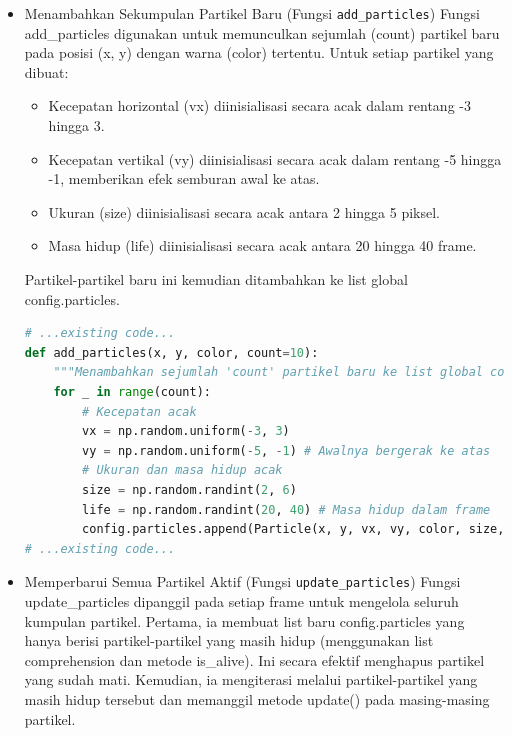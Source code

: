 \documentclass[11pt,a4paper]{article}
\begin{document}
\begin{itemize}
\begin{lstlisting}[language=Python, caption=Method draw]
            if current_size > 0:
                # Untuk menggambar dengan transparansi alpha, perlu blending manual jika tidak menggunakan RGBA image
                # Di sini, kita hanya menggambar lingkaran solid dengan ukuran yang disesuaikan
                # Jika 'img' adalah RGBA, blending bisa lebih canggih
                cv2.circle(img, (int(self.x), int(self.y)), current_size, self.color, -1)
# ...existing code...
\end{lstlisting}
\item Menambahkan Sekumpulan Partikel Baru (Fungsi \texttt{add\_particles})
\newline Fungsi add\_particles digunakan untuk memunculkan sejumlah (count) partikel baru pada posisi (x, y) dengan warna (color) tertentu.
\newline Untuk setiap partikel yang dibuat:
\begin{itemize}
\item Kecepatan horizontal (vx) diinisialisasi secara acak dalam rentang -3 hingga 3.
\item Kecepatan vertikal (vy) diinisialisasi secara acak dalam rentang -5 hingga -1, memberikan efek semburan awal ke atas.
\item Ukuran (size) diinisialisasi secara acak antara 2 hingga 5 piksel.
\item Masa hidup (life) diinisialisasi secara acak antara 20 hingga 40 frame.
\end{itemize}
Partikel-partikel baru ini kemudian ditambahkan ke list global config.particles.
\begin{lstlisting}[language=Python, caption=Fungsi add\_particles]
# ...existing code...
def add_particles(x, y, color, count=10):
    """Menambahkan sejumlah 'count' partikel baru ke list global config.particles."""
    for _ in range(count):
        # Kecepatan acak
        vx = np.random.uniform(-3, 3) 
        vy = np.random.uniform(-5, -1) # Awalnya bergerak ke atas
        # Ukuran dan masa hidup acak
        size = np.random.randint(2, 6)
        life = np.random.randint(20, 40) # Masa hidup dalam frame
        config.particles.append(Particle(x, y, vx, vy, color, size, life))
# ...existing code...
\end{lstlisting}
\item Memperbarui Semua Partikel Aktif (Fungsi \texttt{update\_particles})
\newline Fungsi update\_particles dipanggil pada setiap frame untuk mengelola seluruh kumpulan partikel.
\newline Pertama, ia membuat list baru config.particles yang hanya berisi partikel-partikel yang masih hidup (menggunakan list comprehension dan metode is\_alive). Ini secara efektif menghapus partikel yang sudah mati. Kemudian, ia mengiterasi melalui partikel-partikel yang masih hidup tersebut dan memanggil metode update() pada masing-masing partikel.

\end{itemize}
\end{document}
